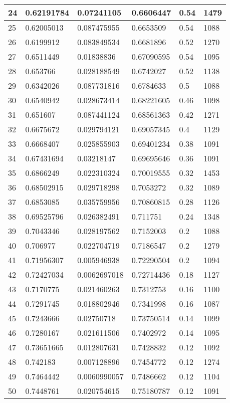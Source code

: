 \begin{longtable}{|l|l|l|l|l|l|}
24 & 0.62191784 & 0.07241105 & 0.6606447 & 0.54 & 1479 \\ \hline 
25 & 0.62005013 & 0.087475955 & 0.6653509 & 0.54 & 1088 \\ \hline 
26 & 0.6199912 & 0.083849534 & 0.6681896 & 0.52 & 1270 \\ \hline 
27 & 0.6511449 & 0.01838836 & 0.67090595 & 0.54 & 1095 \\ \hline 
28 & 0.653766 & 0.028188549 & 0.6742027 & 0.52 & 1138 \\ \hline 
29 & 0.6342026 & 0.087731816 & 0.6784633 & 0.5 & 1088 \\ \hline 
30 & 0.6540942 & 0.028673414 & 0.68221605 & 0.46 & 1098 \\ \hline 
31 & 0.651607 & 0.087441124 & 0.68561363 & 0.42 & 1271 \\ \hline 
32 & 0.6675672 & 0.029794121 & 0.69057345 & 0.4 & 1129 \\ \hline 
33 & 0.6668407 & 0.025855903 & 0.69401234 & 0.38 & 1091 \\ \hline 
34 & 0.67431694 & 0.03218147 & 0.69695646 & 0.36 & 1091 \\ \hline 
35 & 0.6866249 & 0.022310324 & 0.70019555 & 0.32 & 1453 \\ \hline 
36 & 0.68502915 & 0.029718298 & 0.7053272 & 0.32 & 1089 \\ \hline 
37 & 0.6853085 & 0.035759956 & 0.70860815 & 0.28 & 1126 \\ \hline 
38 & 0.69525796 & 0.026382491 & 0.711751 & 0.24 & 1348 \\ \hline 
39 & 0.7043346 & 0.028197562 & 0.7152003 & 0.2 & 1088 \\ \hline 
40 & 0.706977 & 0.022704719 & 0.7186547 & 0.2 & 1279 \\ \hline 
41 & 0.71956307 & 0.005946938 & 0.72290504 & 0.2 & 1094 \\ \hline 
42 & 0.72427034 & 0.0062697018 & 0.72714436 & 0.18 & 1127 \\ \hline 
43 & 0.7170775 & 0.021460263 & 0.7312753 & 0.16 & 1100 \\ \hline 
44 & 0.7291745 & 0.018802946 & 0.7341998 & 0.16 & 1087 \\ \hline 
45 & 0.7243666 & 0.02750718 & 0.73750514 & 0.14 & 1099 \\ \hline 
46 & 0.7280167 & 0.021611506 & 0.7402972 & 0.14 & 1095 \\ \hline 
47 & 0.73651665 & 0.012807631 & 0.7428832 & 0.12 & 1092 \\ \hline 
48 & 0.742183 & 0.007128896 & 0.7454772 & 0.12 & 1274 \\ \hline 
49 & 0.7464442 & 0.0060990057 & 0.7486662 & 0.12 & 1104 \\ \hline 
50 & 0.7448761 & 0.020754615 & 0.75180787 & 0.12 & 1091 \\ \hline 
\end{longtable}